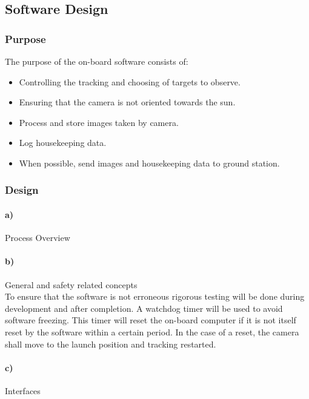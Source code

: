 \pagebreak
\subsection{Software Design}

\subsubsection{Purpose}

The purpose of the on-board software consists of:
\begin{itemize}
	\item Controlling the tracking and choosing of targets to observe.
	\item Ensuring that the camera is not oriented towards the sun.
	\item Process and store images taken by camera.
	\item Log housekeeping data.
	\item When possible, send images and housekeeping data to ground station.
\end{itemize}



\subsubsection{Design} \label{sec:4.8.2}

\paragraph{a)} Process Overview\\



\paragraph{b)} General and safety related concepts\\

To ensure that the software is not erroneous rigorous testing will be done during development and after completion. A watchdog timer will be used to avoid software freezing. This timer will reset the on-board computer if it is not itself reset by the software within a certain period. In the case of a reset, the camera shall move to the launch position and tracking restarted.

\paragraph{c)} Interfaces\\




